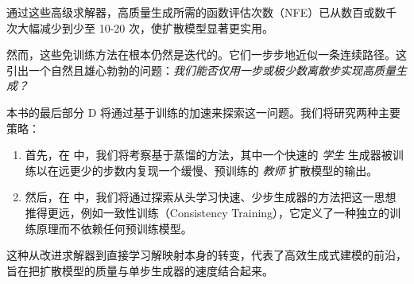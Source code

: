 通过这些高级求解器，高质量生成所需的函数评估次数（NFE）已从数百或数千次大幅减少到少至 10-20 次，使扩散模型显著更实用。

然而，这些免训练方法在根本仍然是迭代的。它们一步步地近似一条连续路径。这引出一个自然且雄心勃勃的问题：\emph{我们能否仅用一步或极少数离散步实现高质量生成？}

本书的最后部分 D 将通过基于训练的加速来探索这一问题。我们将研究两种主要策略：
\begin{enumerate}
    \item 首先，在  中，我们将考察基于蒸馏的方法，其中一个快速的 \textit{学生} 生成器被训练以在远更少的步数内复现一个缓慢、预训练的 \textit{教师} 扩散模型的输出。
    \item 然后，在  中，我们将通过探索从头学习快速、少步生成器的方法把这一思想推得更远，例如一致性训练（Consistency Training），它定义了一种独立的训练原理而不依赖任何预训练模型。
\end{enumerate}

这种从改进求解器到直接学习解映射本身的转变，代表了高效生成式建模的前沿，旨在把扩散模型的质量与单步生成器的速度结合起来。




\clearpage
\newpage
